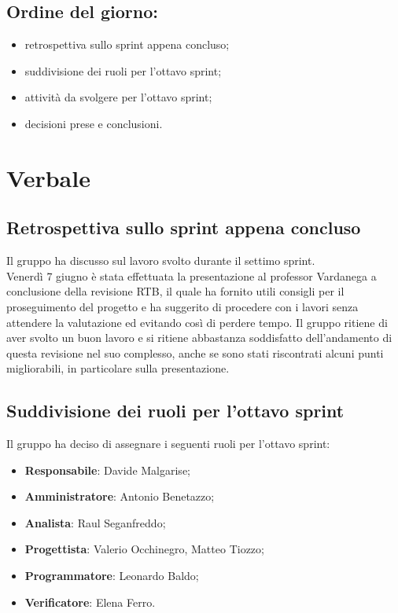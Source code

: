 \documentclass[italian,12pt]{article}
\begin{document}
\subsection*{Ordine del giorno:}
\begin{itemize}
	\item retrospettiva sullo sprint appena concluso;
	\item suddivisione dei ruoli per l'ottavo sprint;
	\item attività da svolgere per l'ottavo sprint;
	\item decisioni prese e conclusioni.
\end{itemize}

\newpage

\section{Verbale}

\subsection{Retrospettiva sullo sprint appena concluso}
Il gruppo ha discusso sul lavoro svolto durante il settimo sprint. \\
Venerdì 7 giugno è stata effettuata la presentazione al professor Vardanega a conclusione della revisione RTB, il quale ha fornito utili consigli per il proseguimento del progetto e ha suggerito di procedere con i lavori senza attendere la valutazione ed evitando così di perdere tempo. Il gruppo ritiene di aver svolto un buon lavoro e si ritiene abbastanza soddisfatto dell'andamento di questa revisione nel suo complesso, anche se sono stati riscontrati alcuni punti migliorabili, in particolare sulla presentazione.

\subsection{Suddivisione dei ruoli per l'ottavo sprint}
Il gruppo ha deciso di assegnare i seguenti ruoli per l'ottavo sprint:
\begin{itemize}
	\item \textbf{Responsabile}: Davide Malgarise;
	\item \textbf{Amministratore}: Antonio Benetazzo;
	\item \textbf{Analista}: Raul Seganfreddo;
	\item \textbf{Progettista}: Valerio Occhinegro, Matteo Tiozzo;
	\item \textbf{Programmatore}: Leonardo Baldo;
	\item \textbf{Verificatore}: Elena Ferro.
\end{itemize}
\end{document}
